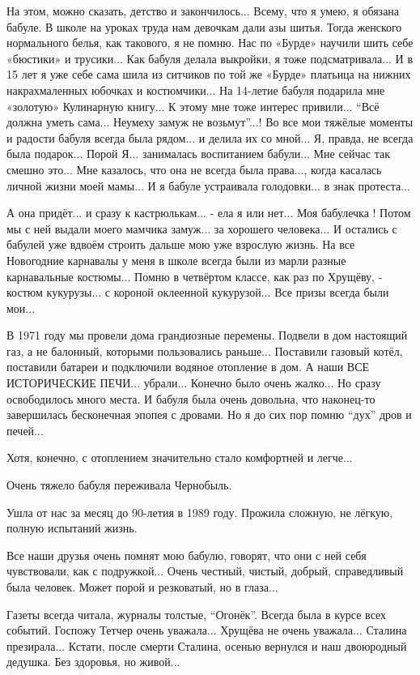 На этом, можно сказать, детство и закончилось... Всему, что я умею, я обязана
бабуле. В школе на уроках труда нам девочкам дали азы шитья. Тогда женского
нормального белья, как такового, я не помню. Нас по «Бурде» научили шить себе
«бюстики» и трусики... Как бабуля делала выкройки, я тоже подсматривала... И в 15
лет я уже себе сама шила из ситчиков по той же «Бурде» платьица на нижних
накрахмаленных юбочках и костюмчики... На 14-летие бабуля подарила мне «золотую»
Кулинарную книгу... К этому мне тоже интерес привили... \enquote{Всё должна уметь сама...
Неумеху замуж не возьмут}...! Во все мои тяжёлые моменты и радости бабуля
всегда была рядом... и делила их со мной... Я, правда, не всегда была подарок...
Порой Я... занималась воспитанием бабули... Мне сейчас так смешно это... Мне
казалось, что она не всегда была права..., когда касалась личной жизни моей мамы...
И я бабуле устраивала голодовки... в знак протеста... 

А она придёт... и сразу к кастрюлькам... - ела я или нет... Моя бабулечка ! Потом
мы с ней выдали моего мамчика замуж... за хорошего человека... И остались с
бабулей уже вдвоём строить дальше мою уже взрослую жизнь. На все Новогодние
карнавалы у меня в школе всегда были из марли разные карнавальные костюмы...
Помню в четвёртом классе, как раз по Хрущёву, - костюм кукурузы... с короной
оклеенной кукурузой... Все призы всегда были мои... 

В 1971 году мы провели дома грандиозные перемены. Подвели в дом настоящий газ,
а не балонный, которыми пользовались раньше... Поставили газовый котёл,
поставили батареи и подключили водяное отопление в дом. А наши ВСЕ ИСТОРИЧЕСКИЕ
ПЕЧИ... убрали... Конечно было очень жалко... Но сразу освободилось много
места. И бабуля была очень довольна, что наконец-то завершилась бесконечная
эпопея с дровами. Но я до сих пор помню \enquote{дух} дров и печей... 

Хотя, конечно, с отоплением значительно стало комфортней и легче... 

Очень тяжело бабуля переживала Чернобыль. 

Ушла от нас за месяц до 90-летия в 1989 году. Прожила сложную, не лёгкую,
полную испытаний жизнь.

Все наши друзья очень помнят мою бабулю, говорят, что они с ней себя
чувствовали, как с подружкой... Очень честный, чистый, добрый, справедливый была
человек. Может порой и резковатый, но в глаза... 

Газеты всегда читала, журналы толстые, \enquote{Огонёк}. Всегда была в курсе всех
событий. Госпожу Тетчер очень уважала... Хрущёва не очень уважала... Сталина
презирала... Кстати, после смерти Сталина, осенью вернулся и наш двоюродный
дедушка. Без здоровья, но живой... 

